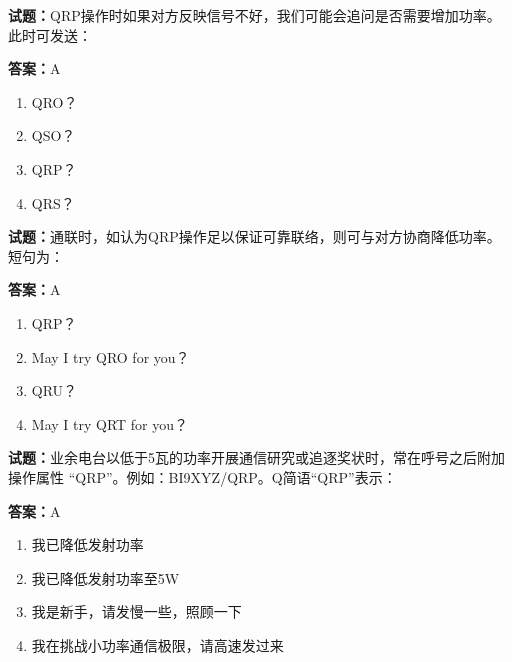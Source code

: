 \documentclass{ctexbook}
\begin{document}




\vspace{1em}

\textbf{试题：}QRP操作时如果对方反映信号不好，我们可能会追问是否需要增加功率。此时可发送： 

\textbf{答案：}A 


\begin{enumerate}[leftmargin=3em]
  \item QRO？ 

  \item QSO？ 

  \item QRP？ 

  \item QRS？ 

\end{enumerate}





\vspace{1em}

\textbf{试题：}通联时，如认为QRP操作足以保证可靠联络，则可与对方协商降低功率。短句为： 

\textbf{答案：}A 

\begin{enumerate}[leftmargin=3em]
  \item QRP？ 

  \item May I try QRO for you？ 

  \item QRU？ 

  \item May I try QRT for you？ 

\end{enumerate}





\vspace{1em}

\textbf{试题：}业余电台以低于5瓦的功率开展通信研究或追逐奖状时，常在呼号之后附加操作属性
“QRP”。例如：BI9XYZ/QRP。Q简语“QRP”表示： 

\textbf{答案：}A 

\begin{enumerate}[leftmargin=3em]
  \item 我已降低发射功率 

  \item 我已降低发射功率至5W 

  \item 我是新手，请发慢一些，照顾一下 

  \item 我在挑战小功率通信极限，请高速发过来 

\end{enumerate}
\end{document}
